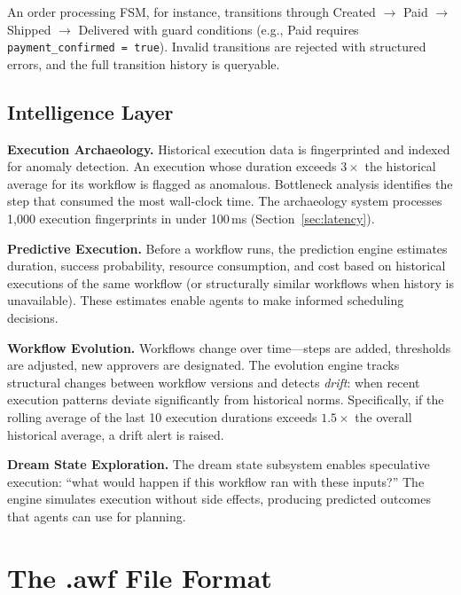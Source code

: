 \documentclass[10pt, twocolumn]{article}
\begin{document}
An order processing FSM, for instance, transitions through Created $\to$ Paid $\to$ Shipped $\to$ Delivered with guard conditions (e.g., Paid requires \texttt{payment\_confirmed = true}). Invalid transitions are rejected with structured errors, and the full transition history is queryable.

\subsection{Intelligence Layer}\label{sec:intelligence}

\textbf{Execution Archaeology.} Historical execution data is fingerprinted and indexed for anomaly detection. An execution whose duration exceeds $3\times$ the historical average for its workflow is flagged as anomalous. Bottleneck analysis identifies the step that consumed the most wall-clock time. The archaeology system processes 1{,}000 execution fingerprints in under 100\,ms (Section~\ref{sec:latency}).

\textbf{Predictive Execution.} Before a workflow runs, the prediction engine estimates duration, success probability, resource consumption, and cost based on historical executions of the same workflow (or structurally similar workflows when history is unavailable). These estimates enable agents to make informed scheduling decisions.

\textbf{Workflow Evolution.} Workflows change over time---steps are added, thresholds are adjusted, new approvers are designated. The evolution engine tracks structural changes between workflow versions and detects \emph{drift}: when recent execution patterns deviate significantly from historical norms. Specifically, if the rolling average of the last 10 execution durations exceeds $1.5\times$ the overall historical average, a drift alert is raised.

\textbf{Dream State Exploration.} The dream state subsystem enables speculative execution: ``what would happen if this workflow ran with these inputs?'' The engine simulates execution without side effects, producing predicted outcomes that agents can use for planning.


\section{The .awf File Format}\label{sec:format}
\end{document}
